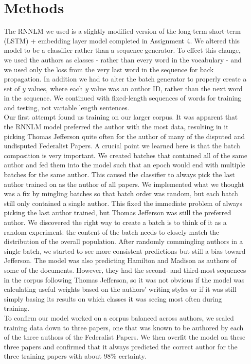 \documentclass[11pt]{article}
\begin{document}
\section{Methods}
The RNNLM we used is a slightly modified version of the long-term short-term (LSTM) + embedding layer model completed in Assignment 4. We altered this model to be a classifier rather than a sequence generator. To effect this change, we used the authors as classes - rather than every word in the vocabulary - and we used only the loss from the very last word in the sequence for back propagation. In addition we had to alter the batch generator to properly create a set of $y$ values, where each $y$ value was an author ID, rather than the next word in the sequence. We continued with fixed-length sequences of words for training and testing, not variable length sentences.\\
Our first attempt found us training on our larger corpus. It was apparent that the RNNLM model preferred the author with the most data, resulting in it picking Thomas Jefferson quite often for the author of many of the disputed and undisputed Federalist Papers. A crucial point we learned here is that the batch composition is very important. We created batches that contained all of the same author and fed them into the model such that an epoch would end with multiple batches for the same author. This caused the classifier to always pick the last author trained on as the author of all papers. We implemented what we thought was a fix by mingling batches so that batch order was random, but each batch still only contained a single author. This fixed the immediate problem of always picking the last author trained, but Thomas Jefferson was still the preferred author. We discovered the right way to create a batch is to think of it as a random experiment: the content of the batch needs to closely match the distribution of the overall population. After randomly commingling authors in a single batch, we started to see more consistent predictions but still a bias toward Jefferson. The model was also predicting Hamilton and Madison as authors of some of the documents. However, they had the second- and third-most sequences in the corpus following Thomas Jefferson, so it was not obvious if the model was calculating useful weights based on the authors' writing styles or if it was still simply basing its results on which classes it was seeing most often during training.\\
To confirm our model worked on a corpus balanced across authors, we scaled training data down to three papers, one that was known to be authored by each of the three authors of the Federalist Papers. We then overfit the model on these three papers and confirmed that it always predicted the correct author for the three training papers with about 98\% certainty.\\
\end{document}
